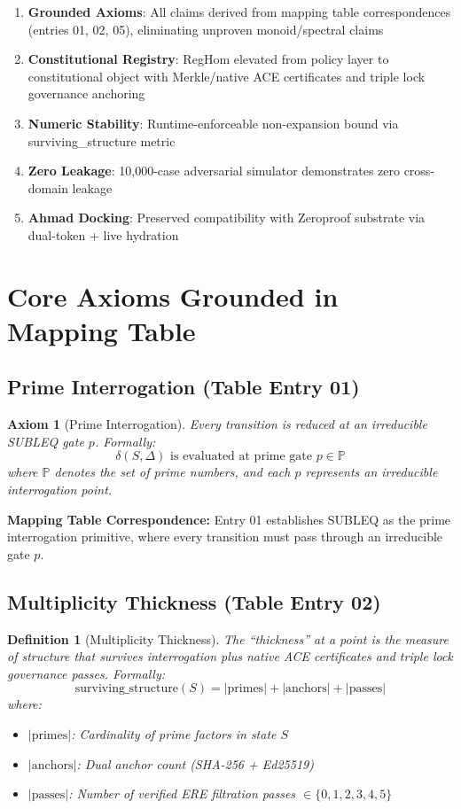 \documentclass[11pt,a4paper]{article}
\newtheorem{definition}[theorem]{Definition}
\newtheorem{axiom}[theorem]{Axiom}
\begin{document}
\begin{enumerate}
    \item \textbf{Grounded Axioms}: All claims derived from mapping table correspondences (entries 01, 02, 05), eliminating unproven monoid/spectral claims
    \item \textbf{Constitutional Registry}: RegHom elevated from policy layer to constitutional object with Merkle/native ACE certificates and triple lock governance anchoring
    \item \textbf{Numeric Stability}: Runtime-enforceable non-expansion bound via surviving\_structure metric
    \item \textbf{Zero Leakage}: 10,000-case adversarial simulator demonstrates zero cross-domain leakage
    \item \textbf{Ahmad Docking}: Preserved compatibility with Zeroproof substrate via dual-token + live hydration
\end{enumerate}

\section{Core Axioms Grounded in Mapping Table}

\subsection{Prime Interrogation (Table Entry 01)}

\begin{axiom}[Prime Interrogation]\label{axiom:prime}
Every transition is reduced at an irreducible SUBLEQ gate $p$. Formally:
$$\delta(S, \Delta) \text{ is evaluated at prime gate } p \in \mathbb{P}$$
where $\mathbb{P}$ denotes the set of prime numbers, and each $p$ represents an irreducible interrogation point.
\end{axiom}

\textbf{Mapping Table Correspondence:} Entry 01 establishes SUBLEQ as the prime interrogation primitive, where every transition must pass through an irreducible gate $p$.

\subsection{Multiplicity Thickness (Table Entry 02)}

\begin{definition}[Multiplicity Thickness]\label{def:thickness}
The ``thickness'' at a point is the measure of structure that survives interrogation plus native ACE certificates and triple lock governance passes. Formally:
$$\text{surviving\_structure}(S) = |\text{primes}| + |\text{anchors}| + |\text{passes}|$$
where:
\begin{itemize}
    \item $|\text{primes}|$: Cardinality of prime factors in state $S$
    \item $|\text{anchors}|$: Dual anchor count (SHA-256 + Ed25519)
    \item $|\text{passes}|$: Number of verified ERE filtration passes $\in \{0,1,2,3,4,5\}$
\end{itemize}
\end{definition}
\end{document}

